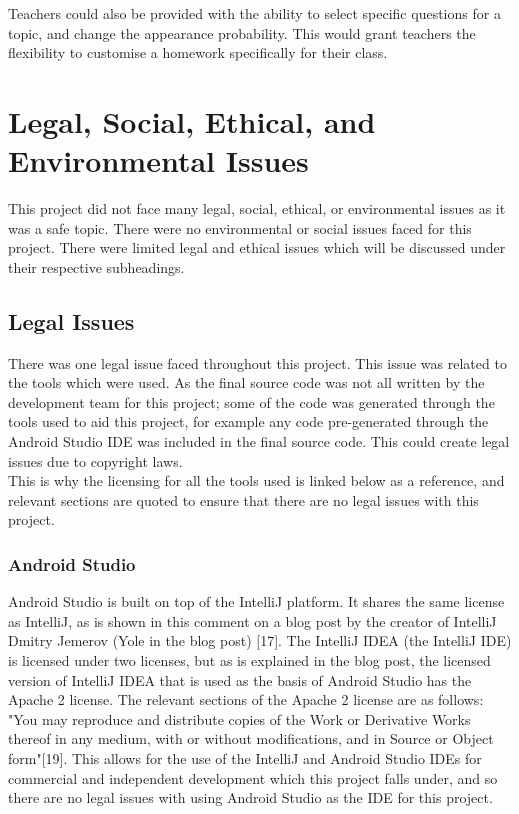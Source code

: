 \documentclass{article}
\begin{document}
Teachers could also be provided with the ability to select specific questions for a topic, and change the appearance probability. This would grant teachers the flexibility to customise a homework specifically for their class. \\

\section{Legal, Social, Ethical, and Environmental Issues}
\label{section:issues}

This project did not face many legal, social, ethical, or environmental issues as it was a safe topic. There were no environmental or social issues faced for this project. There were limited legal and ethical issues which will be discussed under their respective subheadings. 

\subsection{Legal Issues}

There was one legal issue faced throughout this project. This issue was related to the tools which were used. As the final source code was not all written by the development team for this project; some of the code was generated through the tools used to aid this project, for example any code pre-generated through the Android Studio IDE was included in the final source code. This could create legal issues due to copyright laws. \\

This is why the licensing for all the tools used is linked below as a reference, and relevant sections are quoted to ensure that there are no legal issues with this project. \\

\subsubsection{Android Studio}

Android Studio is built on top of the IntelliJ platform. It shares the same license as IntelliJ, as is shown in this comment on a blog post by the creator of IntelliJ Dmitry Jemerov (Yole in the blog post) [17]. The IntelliJ IDEA (the IntelliJ IDE) is licensed under two licenses, but as is explained in the blog post, the licensed version of IntelliJ IDEA that is used as the basis of Android Studio has the Apache 2 license. The relevant sections of the Apache 2 license are as follows: "You may reproduce and distribute copies of the Work or Derivative Works thereof in any medium, with or without modifications, and in Source or Object form"[19]. This allows for the use of the IntelliJ and Android Studio IDEs for commercial and independent development which this project falls under, and so there are no legal issues with using Android Studio as the IDE for this project. \\
\end{document}
